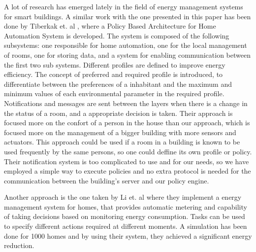 \label{chap:relatedwork}
A lot of research has emerged lately in the field of energy management systems for smart buildings. 
A similar work with the one presented in this paper has been done by Tiberkak et. al \cite{Tiberkak10}, where a Policy Based Architecture for Home Automation
System is developed. The system is composed of the following subsystems: one responsible
for home automation, one for the local management of rooms, one for storing data, and a system for enabling communication between the first two sub systems. Different profiles are defined to improve energy efficiency.
The concept of preferred and required profile is introduced, to differentiate between the preferences of a inhabitant and the maximum and minimum values of each environmental parameter in the required profile. Notifications
and messages are sent between the layers when there is a change in the status of a room, and a appropriate decision is taken. Their approach is focused more on the confort of a person in the house than our approach, which is focused more on the management of a bigger building with more sensors and actuators. This approach could be used if a room in a building is known to be used frequently by the same persons, so one could deffine its own profile or policy. Their notification system is too complicated to use and for our needs, so we have employed a simple way to execute policies and no extra protocol is needed for the communication between the building's server and our policy engine.

Another approach is the one taken by Li et. al \cite{Li11} where they implement a energy management system for homes, that provides automatic metering and capability of taking decisions based on monitoring energy consumption. 
Tasks can be used to specify different actions required at different moments. A simulation has been done for 1000 homes and by using their system, they achieved a significant energy reduction.

